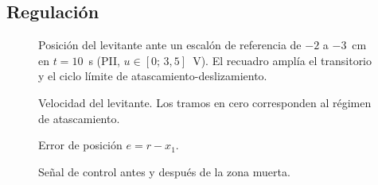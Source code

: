 \FloatBarrier
\newpage

\subsection{Regulación}

\begin{figure}[ht]
    \centering
    
    \caption[Posición (regulación)]{Posición del levitante ante un escalón de referencia de $-2$ a $-3$~cm en $t=10$~s (PII, $u\in[0;\,3{,}5]$~V). El recuadro amplía el transitorio y el ciclo límite de atascamiento-deslizamiento.}
    \label{posicion}
\end{figure}

\begin{figure}[ht]
    \centering
    
    \caption[Velocidad (regulación)]{Velocidad del levitante. Los tramos en cero corresponden al régimen de atascamiento.}
    \label{velocidad}
\end{figure}

\begin{figure}[ht]
    \centering
    
    \caption[Error (regulación)]{Error de posición $e=r-x_1$.}
    \label{error}
\end{figure}

\begin{figure}[ht]
    \centering
    
    \caption[Señal de control (regulación)]{Señal de control antes y después de la zona muerta.}
    \label{senal_control}
\end{figure}

\FloatBarrier
\newpage







